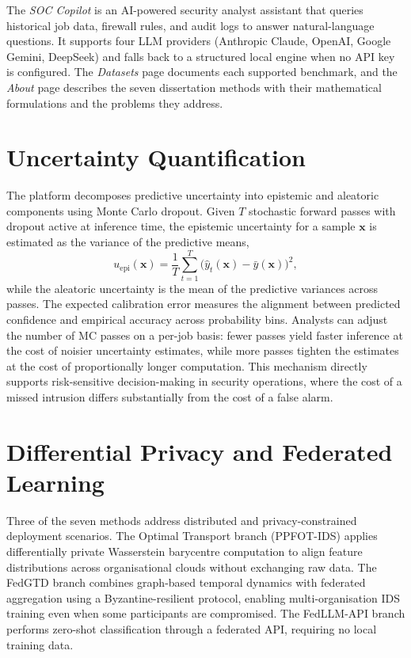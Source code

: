 \documentclass[11pt,a4paper]{article}
\begin{document}
The \textit{SOC Copilot} is an AI-powered security analyst assistant
that queries historical job data, firewall rules, and audit logs to
answer natural-language questions. It supports four LLM providers
(Anthropic Claude, OpenAI, Google Gemini, DeepSeek) and falls back to
a structured local engine when no API key is configured. The
\textit{Datasets} page documents each supported benchmark, and the
\textit{About} page describes the seven dissertation methods with their
mathematical formulations and the problems they address.

\section{Uncertainty Quantification}

The platform decomposes predictive uncertainty into epistemic and aleatoric
components using Monte Carlo dropout. Given $T$ stochastic forward passes
with dropout active at inference time, the epistemic uncertainty for a
sample $\mathbf{x}$ is estimated as the variance of the predictive means,
\begin{equation}
  u_{\text{epi}}(\mathbf{x}) = \frac{1}{T} \sum_{t=1}^{T}
  \bigl(\hat{y}_t(\mathbf{x}) - \bar{y}(\mathbf{x})\bigr)^2,
\end{equation}
while the aleatoric uncertainty is the mean of the predictive variances
across passes. The expected calibration error measures the alignment
between predicted confidence and empirical accuracy across probability
bins. Analysts can adjust the number of MC passes on a per-job basis:
fewer passes yield faster inference at the cost of noisier uncertainty
estimates, while more passes tighten the estimates at the cost of
proportionally longer computation. This mechanism directly supports
risk-sensitive decision-making in security operations, where the cost
of a missed intrusion differs substantially from the cost of a false
alarm.

\section{Differential Privacy and Federated Learning}

Three of the seven methods address distributed and privacy-constrained
deployment scenarios. The Optimal Transport branch (PPFOT-IDS) applies
differentially private Wasserstein barycentre computation to align feature
distributions across organisational clouds without exchanging raw data.
The FedGTD branch combines graph-based temporal dynamics with federated
aggregation using a Byzantine-resilient protocol, enabling multi-organisation
IDS training even when some participants are compromised. The FedLLM-API
branch performs zero-shot classification through a federated API, requiring
no local training data.
\end{document}
